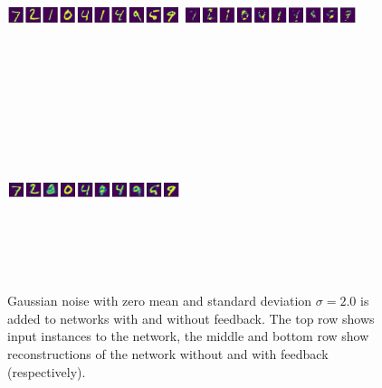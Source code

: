 \documentclass{article}
\begin{document}
	\begin{figure}[H]
      \centering
      \includegraphics[width=0.45\textwidth,height=5cm,keepaspectratio]{img/actnoise_recs/input.png}
      \includegraphics[width=0.45\textwidth,height=5cm,keepaspectratio]{img/actnoise_recs/standardrec.png}
      \includegraphics[width=0.45\textwidth,height=5cm,keepaspectratio]{img/actnoise_recs/feedbackrec.png}
      \caption{Gaussian noise with zero mean and standard deviation $\sigma=2.0$ is added to networks with and without feedback. The top row shows input instances to the network, the middle and bottom row show reconstructions of the network without and with feedback (respectively).}
      \label{fig:noiseact}
  \end{figure}
  
\end{document}
